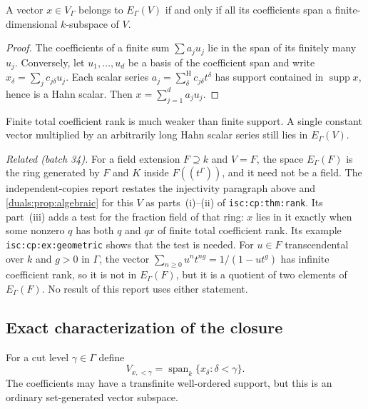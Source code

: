 \documentclass[11pt,letterpaper]{article}
\numberwithin{equation}{section}
\theoremstyle{definition}
\theoremstyle{remark}
\newcommand{\supp}{\operatorname{supp}}
\newcommand{\Span}{\operatorname{span}}
\newcommand{\sH}{\mathop{\sum}\nolimits^{\mathrm H}}
\newcommand{\lab}[1]{\texttt{#1}}
\begin{document}
\begin{proposition}\label{duals:prop:algebraic}
A vector $x\in V_\Gamma$ belongs to $E_\Gamma(V)$ if and only if all
its coefficients span a finite-dimensional $k$-subspace of $V$.
\end{proposition}
\begin{proof}
The coefficients of a finite sum $\sum a_ju_j$ lie in the span of its
finitely many $u_j$. Conversely, let $u_1,\ldots,u_d$ be a basis of the
coefficient span and write $x_\delta=\sum_j c_{j\delta}u_j$.
Each scalar series $a_j=\sH_\delta c_{j\delta}t^\delta$ has support
contained in $\supp x$, hence is a Hahn scalar. Then
$x=\sum_{j=1}^da_ju_j$.
\end{proof}

Finite total coefficient rank is much weaker than finite support. A
single constant vector multiplied by an arbitrarily long Hahn scalar
series still lies in $E_\Gamma(V)$.

\emph{Related (batch 34).} For a field extension $F\supseteq k$ and
$V=F$, the space $E_\Gamma(F)$ is the ring generated by $F$ and $K$ inside
$F((t^\Gamma))$, and it need not be a field. The independent-copies report
restates the injectivity paragraph above and \cref{duals:prop:algebraic}
for this $V$ as parts~(i)--(ii) of \lab{isc:cp:thm:rank}. Its part~(iii)
adds a test for the fraction field of that ring: $x$ lies in it exactly
when some nonzero $q$ has both $q$ and $qx$ of finite total coefficient
rank. Its example \lab{isc:cp:ex:geometric} shows that the test is needed.
For $u\in F$ transcendental over $k$ and $g>0$ in $\Gamma$, the vector
$\sum_{n\ge0}u^nt^{ng}=1/(1-ut^g)$ has infinite coefficient rank, so it is
not in $E_\Gamma(F)$, but it is a quotient of two elements of
$E_\Gamma(F)$. No result of this report uses either statement.

\subsection{Exact characterization of the closure}
For a cut level $\gamma\in\Gamma$ define
\[
 V_{x,<\gamma}=\Span_k\{x_\delta:\delta<\gamma\}.
\]
The coefficients may have a transfinite well-ordered support, but this
is an ordinary set-generated vector subspace.
\end{document}

